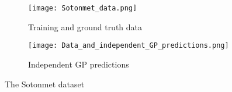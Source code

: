\begin{figure}
    \centering
    \begin{subfigure}{0.45\textwidth}
        \centering
        \texttt{[image: Sotonmet\_data.png]}
        \caption{Training and ground truth data}
        \label{fig:data}
    \end{subfigure}
    \begin{subfigure}{0.45\textwidth}
        \centering
        \texttt{[image: Data\_and\_independent\_GP\_predictions.png]}
        \caption{Independent GP predictions}
        \label{fig:ind_pres}
    \end{subfigure}
    \caption{The Sotonmet dataset}
    \label{fig:sotonmet}
\end{figure}
